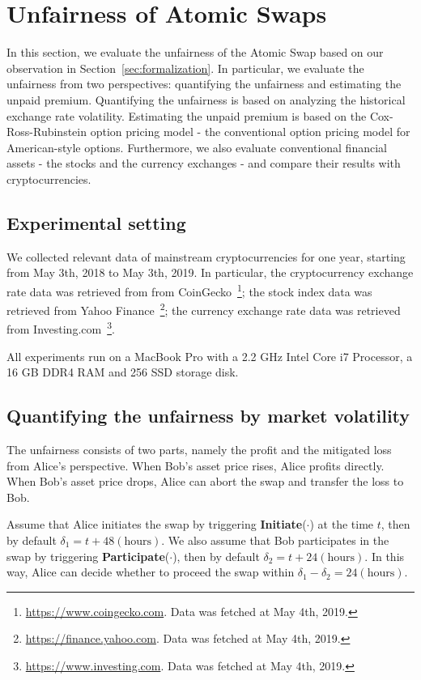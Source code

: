 \section{Unfairness of Atomic Swaps}
\label{sec:evaluation}

In this section, we evaluate the unfairness of the Atomic Swap based on our observation in Section~\ref{sec:formalization}.
In particular, we evaluate the unfairness from two perspectives: quantifying the unfairness and estimating the unpaid premium.
Quantifying the unfairness is based on analyzing the historical exchange rate volatility.
Estimating the unpaid premium is based on the Cox-Ross-Rubinstein option pricing model - the conventional option pricing model for American-style options.
Furthermore, we also evaluate conventional financial assets - the stocks and the currency exchanges - and compare their results with cryptocurrencies.

\subsection{Experimental setting}

We collected relevant data of mainstream cryptocurrencies for one year, starting from May 3th, 2018 to May 3th, 2019.
In particular, the cryptocurrency exchange rate data was retrieved from from CoinGecko~\footnote{\url{https://www.coingecko.com}. Data was fetched at May 4th, 2019.};
the stock index data was retrieved from Yahoo Finance~\footnote{\url{https://finance.yahoo.com}. Data was fetched at May 4th, 2019.};
the currency exchange rate data was retrieved from Investing.com~\footnote{\url{https://www.investing.com}. Data was fetched at May 4th, 2019.}.

All experiments run on a MacBook Pro with a 2.2 GHz Intel Core i7 Processor, a 16 GB DDR4 RAM and 256  SSD storage disk.

\subsection{Quantifying the unfairness by market volatility}
\label{subsec:volatility_analysis}

The unfairness consists of two parts, namely the profit and the mitigated loss from Alice's perspective.
When Bob's asset price rises, Alice profits directly.
When Bob's asset price drops, Alice can abort the swap and transfer the loss to Bob.


Assume that Alice initiates the swap by triggering \textbf{Initiate}($\cdot$) at the time $t$, then by default $\delta_1 = t + 48 (\text{hours})$.
We also assume that Bob participates in the swap by triggering \textbf{Participate}($\cdot$), then by default $\delta_2 = t + 24 (\text{hours})$.
In this way, Alice can decide whether to proceed the swap within $ \delta_1 - \delta_2 = 24 (\text{hours})$.

